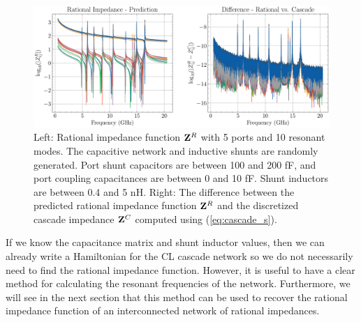 \begin{figure}[h!]
    \centering
    \includegraphics[width=\textwidth]{figures/5_port_10_res_rand.pdf}
    \caption{Left: Rational impedance function $\vb{Z}^R$ with 5 ports and 10 resonant modes. The capacitive network and inductive shunts are randomly generated. Port shunt capacitors are between 100 and 200 fF, and port coupling capacitances are between 0 and 10 fF. Shunt inductors are between 0.4 and 5 nH. Right: The difference between the predicted rational impedance function $\vb{Z}^R$ and the discretized cascade impedance $\vb{Z}^C$ computed using (\ref{eq:cascade_s}).}
    \label{fig:rand_impedance_ex}
\end{figure}

If we know the capacitance matrix and shunt inductor values, then we can already write a Hamiltonian for the CL cascade network so we do not necessarily need to find the rational impedance function. However, it is useful to have a clear method for calculating the resonant frequencies of the network. Furthermore, we will see in the next section that this method can be used to recover the rational impedance function of an interconnected network of rational impedances.